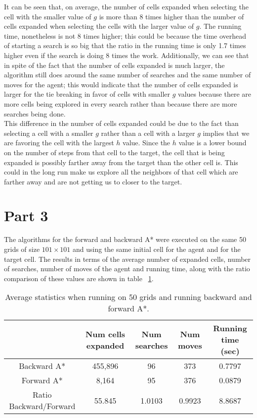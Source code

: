 \documentclass{article}
\begin{document}
It can be seen that, on average, the number of cells expanded when selecting the cell with the smaller value of $g$ is more than 8 times higher than the number of cells expanded when selecting the cells with the larger value of $g$. The running time, nonetheless is not 8 times higher; this could be because the time overhead of starting a search is so big that the ratio in the running time is only 1.7 times higher even if the search is doing 8 times the work. Additionally, we can see that in spite of the fact that the number of cells expanded is much larger, the algorithm still does around the same number of searches and the same number of moves for the agent; this would indicate that the number of cells expanded is larger for the tie breaking in favor of cells with smaller $g$ values because there are more cells being explored in every search rather than because there are more searches being done.\\
This difference in the number of cells expanded could be due to the fact than selecting a cell with a smaller $g$ rather than a cell with a larger $g$ implies that we are favoring the cell with the largest $h$ value. Since the $h$ value is a lower bound on the number of steps from that cell to the target, the cell that is being expanded is possibly farther away from the target than the other cell is. This could in the long run make us explore all the neighbors of that cell which are farther away and are not getting us to closer to the target.

\section*{Part 3}

The algorithms for the forward and backward A* were executed on the same 50 grids of size $101 \times 101$ and using the same initial cell for the agent and for the target cell. The results in terms of the average number of expanded cells, number of searches, number of moves of the agent and running time, along with the ratio comparison of these values are shown in table~ \ref{tab:back_for}.

\begin{table}[h]
  \begin{center}
    \begin{tabular}{|*{5}{c|}}
      \cline{2-5}
      \multicolumn{1}{c|}{} & Num cells expanded & Num searches & Num moves & Running time (sec) \\ \hline
      Backward A* & 455,896 & 96 & 373 & 0.7797\\ \hline 
      Forward A*  & 8,164  & 95 & 376 & 0.0879 \\ \hline \hline
      Ratio Backward/Forward & 55.845 & 1.0103 & 0.9923 & 8.8687 \\ \hline
    \end{tabular}
  \end{center}
  \caption{Average statistics when running on 50 grids and running backward and forward A*.}
  \label{tab:back_for}
\end{table}
\end{document}
